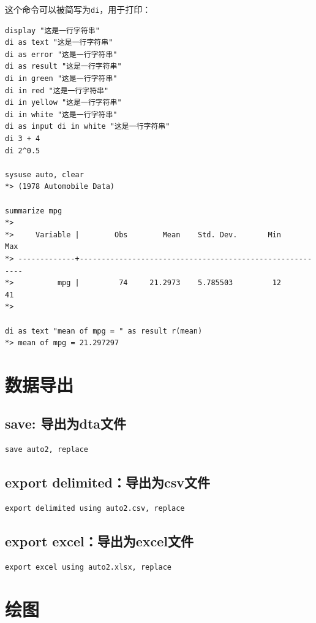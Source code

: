 这个命令可以被简写为\texttt{di}，用于打印：

\begin{lstlisting}
display "这是一行字符串"
di as text "这是一行字符串"
di as error "这是一行字符串"
di as result "这是一行字符串"
di in green "这是一行字符串"
di in red "这是一行字符串"
di in yellow "这是一行字符串"
di in white "这是一行字符串"
di as input di in white "这是一行字符串"
di 3 + 4
di 2^0.5

sysuse auto, clear
*> (1978 Automobile Data)

summarize mpg
*>
*>     Variable |        Obs        Mean    Std. Dev.       Min        Max
*> -------------+---------------------------------------------------------
*>          mpg |         74     21.2973    5.785503         12         41
*>

di as text "mean of mpg = " as result r(mean)
*> mean of mpg = 21.297297
\end{lstlisting}

\section{数据导出}
\subsection{save: 导出为dta文件}

\begin{lstlisting}
save auto2, replace
\end{lstlisting}

\subsection{export delimited：导出为csv文件}

\begin{lstlisting}
export delimited using auto2.csv, replace
\end{lstlisting}

\subsection{export excel：导出为excel文件}

\begin{lstlisting}
export excel using auto2.xlsx, replace
\end{lstlisting}

\section{绘图}
